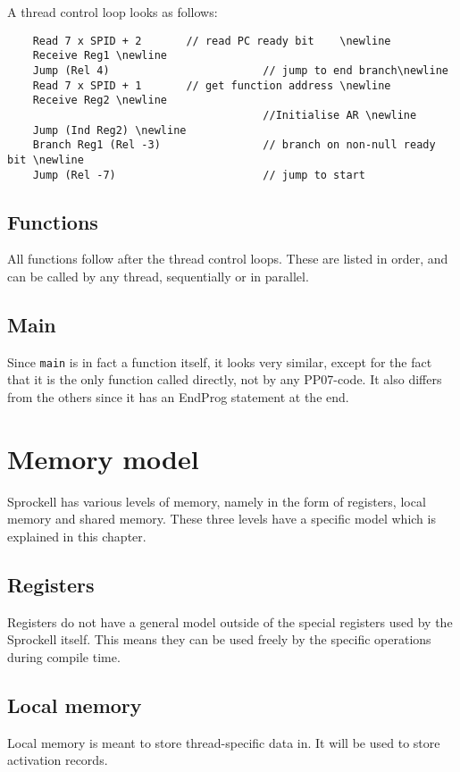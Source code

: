 \documentclass[10pt,a4paper]{report}
\begin{document}
A thread control loop looks as follows:
\begin{verbatim}
	Read 7 x SPID + 2		// read PC ready bit 	\newline
	Receive Reg1 \newline
	Jump (Rel 4)						// jump to end branch\newline
	Read 7 x SPID + 1		// get function address \newline
	Receive Reg2 \newline
										//Initialise AR \newline
	Jump (Ind Reg2) \newline
	Branch Reg1 (Rel -3)				// branch on non-null ready bit \newline
	Jump (Rel -7)						// jump to start
\end{verbatim}

\section{Functions}
All functions follow after the thread control loops. These are listed in order, and can be called by any thread, sequentially or in parallel.

\section{Main}
Since \texttt{main} is in fact a function itself, it looks very similar, except for the fact that it is the only function called directly, not by any PP07-code. It also differs from the others since it has an EndProg statement at the end.

\chapter{Memory model}
Sprockell has various levels of memory, namely in the form of registers, local memory and shared memory. These three levels have a specific model which is explained in this chapter.

\section{Registers}
Registers do not have a general model outside of the special registers used by the Sprockell itself. This means they can be used freely by the specific operations during compile time.

\section{Local memory}
Local memory is meant to store thread-specific data in. It will be used to store activation records. 
\end{document}
